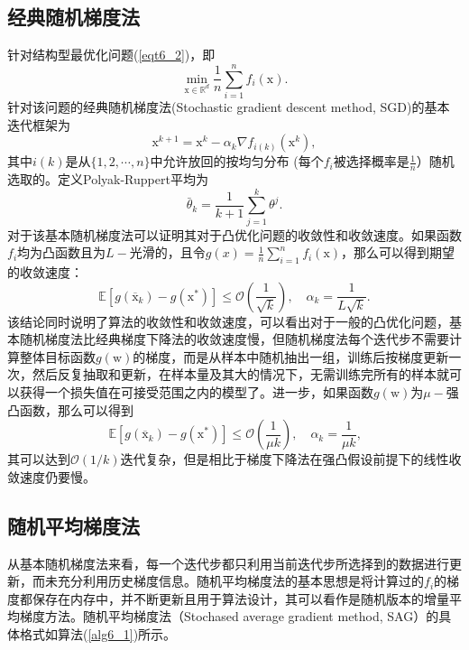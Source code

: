 \subsection{经典随机梯度法}
针对结构型最优化问题(\ref{eqt6_2})，即
\begin{equation}
    \min _{\mathrm{x} \in \mathbb{R}^{d}} \frac{1}{n} \sum_{i=1}^{n} f_{i}(\mathrm{x})
    \text {.}
    \nonumber
\end{equation}
针对该问题的经典随机梯度法(Stochastic gradient descent method, SGD)\cite{SGD}的基本迭代框架为
\begin{equation}
    \mathrm{x}^{k+1}=\mathrm{x}^{k}-\alpha_{k} \nabla f_{i(k)}\left(\mathrm{x}^{k}\right),
    \label{eqt6_3}
\end{equation}
其中$i(k)$是从$\{1, 2, \cdots, n\}$中允许放回的按均匀分布 (每个$f_{i}$被选择概率是$\frac{1}{n}$）随机选取的。定义Polyak-Ruppert平均\cite{2021Statistical}为
\begin{equation}
    \bar{\theta}_{k}=\frac{1}{k+1} \sum_{j=1}^{k} \theta^{j}
    \label{eqt6_4}
    \text {.}
\end{equation}
对于该基本随机梯度法可以证明其对于凸优化问题的收敛性和收敛速度。如果函数$f_{i}$均为凸函数且为$L-$光滑的，且令$g(x)=\frac{1}{n} \sum_{i=1}^{n} f_{i}(\mathrm{x})$，那么可以得到期望的收敛速度：
\begin{equation}
    \mathbb{E}\left[g\left(\overline{\mathrm{x}}_{k}\right)-g\left(\mathrm{x}^{*}\right)\right] \leq \mathcal{O}\left(\frac{1}{\sqrt{k}}\right), \quad \alpha_{k}=\frac{1}{L \sqrt{k}}
    \text {.}
    \label{eqt6_5}
\end{equation}
该结论同时说明了算法的收敛性和收敛速度\cite{SGD}，可以看出对于一般的凸优化问题，基本随机梯度法比经典梯度下降法的收敛速度慢，但随机梯度法每个迭代步不需要计算整体目标函数$g(\mathrm{w})$的梯度，而是从样本中随机抽出一组，训练后按梯度更新一次，然后反复抽取和更新，在样本量及其大的情况下，无需训练完所有的样本就可以获得一个损失值在可接受范围之内的模型了。进一步，如果函数$g(\mathrm{w})$为$\mu-$强凸函数，那么可以得到
\begin{equation}
    \mathbb{E}\left[g\left(\overline{\mathrm{x}}_{k}\right)-g\left(\mathrm{x}^{*}\right)\right] \leq \mathcal{O}\left(\frac{1}{\mu k}\right), \quad \alpha_{k}=\frac{1}{\mu k}
    \label{eqt6_6}
    \text {,}
\end{equation}
其可以达到$\mathcal{O}(1 / k)$迭代复杂，但是相比于梯度下降法在强凸假设前提下的线性收敛速度仍要慢。

\subsection{随机平均梯度法}
从基本随机梯度法来看，每一个迭代步都只利用当前迭代步所选择到的数据进行更新，而未充分利用历史梯度信息。随机平均梯度法的基本思想是将计算过的$f_i$的梯度都保存在内存中，并不断更新且用于算法设计，其可以看作是随机版本的增量平均梯度方法。随机平均梯度法（Stochased average gradient method, SAG）\cite{SAG}的具体格式如算法(\ref{alg6_1})所示。

